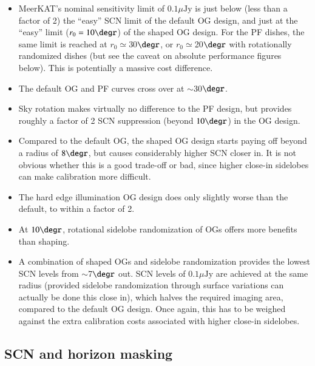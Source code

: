 \documentclass{aa}
\begin{document}
\begin{itemize}
  \item MeerKAT's nominal sensitivity limit of $0.1 \mu\mathrm{Jy}$ is just below (less than a factor of 2) the ``easy'' SCN limit of the default OG design, and just at the ``easy'' limit ($r_0=10\degr$) of the shaped OG design. For the PF dishes,  the same limit is reached at $r_0\simeq$30$\degr$, or $r_0\simeq$20$\degr$ with rotationally randomized dishes (but see the caveat on absolute performance figures below). This is potentially a massive cost difference.
  \item The default OG and PF curves cross over at $\sim$30$\degr$.
  \item Sky rotation makes virtually no difference to the PF design, but provides roughly a factor of 2 SCN suppression (beyond $10\degr$) in the OG design.
  \item Compared to the default OG, the shaped OG design starts paying off beyond a radius of $8\degr$, but causes considerably higher SCN closer in. It is not obvious whether this is a good trade-off or bad, since higher close-in sidelobes can make calibration more difficult.
  \item The hard edge illumination OG design does only slightly worse than the default, to within a factor of 2.
  \item At $10\degr$, rotational sidelobe randomization of OGs offers more benefits than shaping.
  \item A combination of shaped OGs and sidelobe randomization provides the lowest SCN levels from $\sim$7$\degr$ out.
  SCN levels of $0.1 \mu\mathrm{Jy}$ are achieved at the same radius (provided sidelobe randomization through surface variations can actually be done this close in), which halves the required imaging area, compared to the default OG design. Once again, this has to be weighed against the extra calibration costs associated with higher close-in sidelobes.
\end{itemize}

\subsection{SCN and horizon masking}
\label{sec:results-horizon-masking}
\end{document}
